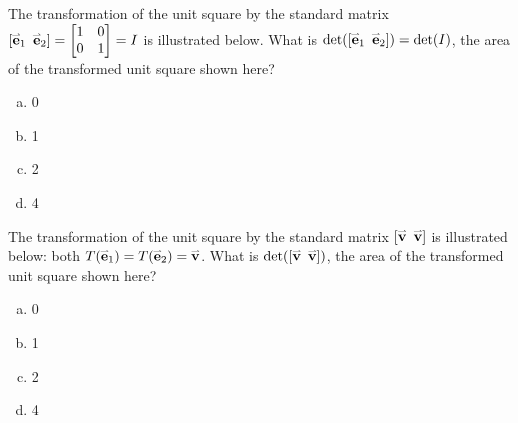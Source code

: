 \begin{activity}{2}
The transformation of the unit square by the
standard matrix \([\vec{e}_1\hspace{0.5em} \vec{e}_2]=\begin{bmatrix}1&0\\0&1\end{bmatrix}=I\) is illustrated below.
What is $\det([\vec{e}_1\hspace{0.5em} \vec{e}_2])=\det(I)$, the
area of the transformed unit square shown here?
\begin{center}
\end{center}
  \begin{enumerate}[a)]
    \item 0
    \item 1
    \item 2
    \item 4
  \end{enumerate}
\end{activity}

\begin{activity}{2}
The transformation of the unit square by the
standard matrix \([\vec{v}\hspace{0.5em} \vec{v}]\) is illustrated below: both
\(T(\vec{e}_1)=T(\vect{e}_2)=\vec{v}\).
What is \(\det([\vec{v}\hspace{0.5em} \vec{v}])\), 
the area of the transformed unit square shown here?
\begin{center}
\end{center}
  \begin{enumerate}[a)]
    \item 0
    \item 1
    \item 2
    \item 4
  \end{enumerate}
\end{activity}


